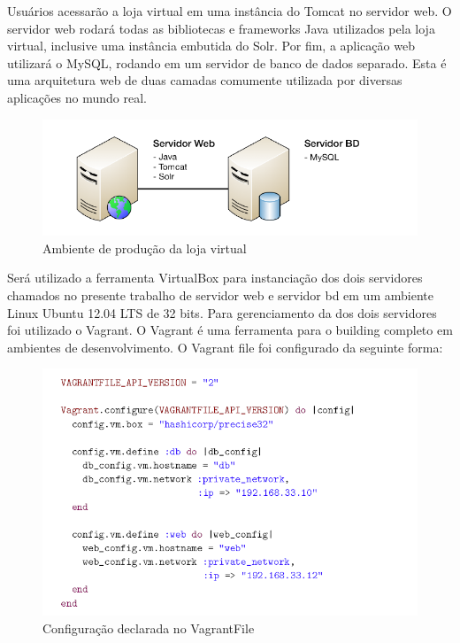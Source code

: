 Usuários acessarão a loja virtual em uma instância do Tomcat no servidor web. O servidor web rodará todas as bibliotecas e frameworks Java utilizados pela loja virtual, inclusive uma instância embutida do Solr. Por fim, a aplicação web utilizará o MySQL, rodando em um servidor de banco de dados separado. Esta é uma arquitetura web de duas camadas comumente utilizada por diversas aplicações no mundo real.

\begin {figure} [!htb]
\centering
\includegraphics{imagens/servidores}
\caption{Ambiente de produção da loja virtual}
\end{figure}

Será utilizado a ferramenta VirtualBox para instanciação dos dois servidores chamados no presente trabalho de servidor web   e servidor bd em um ambiente Linux Ubuntu 12.04 LTS de 32 bits.
Para gerenciamento da dos dois servidores foi utilizado o Vagrant. O Vagrant é uma ferramenta para o building completo em ambientes de desenvolvimento.
O Vagrant file foi configurado da seguinte forma:

\begin {figure} [!htb]
\centering
\includegraphics{imagens/vagrantfile}
\caption{Configuração declarada no VagrantFile}
\end{figure}

